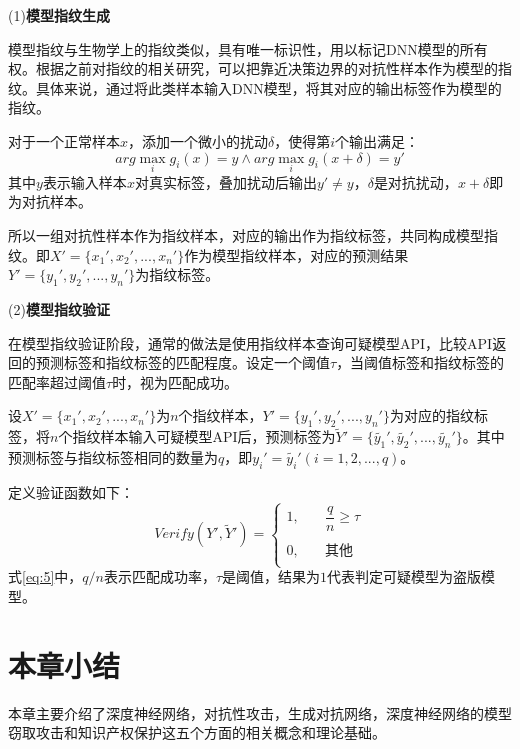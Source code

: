 \noindent(1)\textbf{模型指纹生成}

模型指纹与生物学上的指纹类似，具有唯一标识性，用以标记DNN模型的所有权。根据之前对指纹的相关研究\cite{zhao2020afa,lukas2019deep,cao2021ipguard}，可以把靠近决策边界的对抗性样本作为模型的指纹。具体来说，通过将此类样本输入DNN模型，将其对应的输出标签作为模型的指纹。

对于一个正常样本$x$，添加一个微小的扰动$\delta$，使得第$i$个输出满足：
\begin{equation}
	\label{eq:4}
	arg \mathop{max} \limits_i g_i(x) = y \wedge arg \mathop{max} \limits_i g_i(x + \delta) = y'
\end{equation}
其中$y$表示输入样本$x$对真实标签，叠加扰动后输出$y' \neq y$，$\delta$是对抗扰动，$x + \delta$即为对抗样本。

所以一组对抗性样本作为指纹样本，对应的输出作为指纹标签，共同构成模型指纹。即$X' = \{x_1',x_2',...,x_n'\}$作为模型指纹样本，对应的预测结果$Y' = \{y_1', y_2',...,y_n'\}$为指纹标签。

\noindent(2)\textbf{模型指纹验证}

在模型指纹验证阶段，通常的做法是使用指纹样本查询可疑模型API，比较API返回的预测标签和指纹标签的匹配程度。设定一个阈值$\tau$，当阈值标签和指纹标签的匹配率超过阈值$\tau$时，视为匹配成功。

设$X' = \{x_1',x_2',...,x_n'\}$为$n$个指纹样本，$Y' = \{y_1', y_2',...,y_n'\}$为对应的指纹标签，将$n$个指纹样本输入可疑模型API后，预测标签为$\widetilde{Y}' = \{\widetilde{y_1}', \widetilde{y_2}',...,\widetilde{y_n}'\}$。其中预测标签与指纹标签相同的数量为$q$，即$y_i' = \widetilde{y_i}'(i = 1, 2,...,q)$。

定义验证函数如下：
\begin{equation}
	\label{eq:5}
	Verify(Y', \widetilde{Y}')= \left
	\{ 
	\begin{array}{ll} 
		1, &\quad \dfrac{q}{n} \geq \tau \\ 
		\\
		0, &\quad \mbox{其他}\\ 
	\end{array} 
	\right.
\end{equation}
式\ref{eq:5}中，$q/n$表示匹配成功率，$\tau$是阈值，结果为$1$代表判定可疑模型为盗版模型。


\section{本章小结}

本章主要介绍了深度神经网络，对抗性攻击，生成对抗网络，深度神经网络的模型窃取攻击和知识产权保护这五个方面的相关概念和理论基础。
